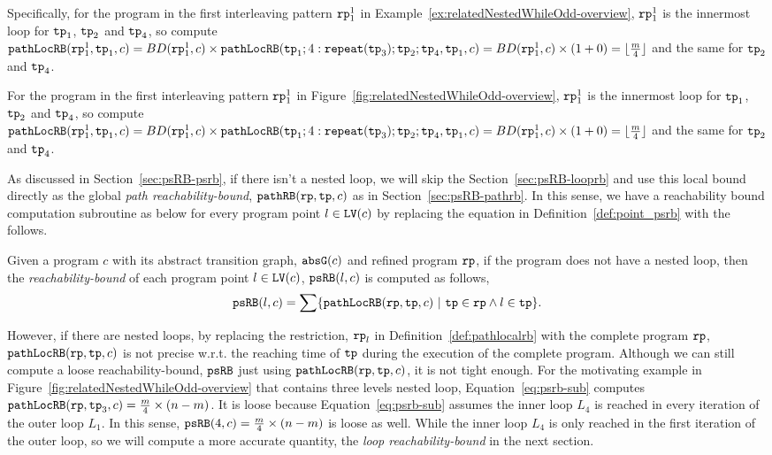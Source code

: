 Specifically, for the program in the first interleaving pattern $\mathtt{rp}_1^1$ in Example~\ref{ex:relatedNestedWhileOdd-overview}, $\mathtt{rp}_1^1$ is the innermost loop for $\mathtt{tp}_1$, $\mathtt{tp}_2$ and $\mathtt{tp}_4$, 
so compute $\mathtt{pathLocRB}(\mathtt{rp}_1^1, \mathtt{tp}_1, c) = BD(\mathtt{rp}_1^1, c) \times \mathtt{pathLocRB}(\mathtt{tp}_1; 4:\mathtt{repeat}(\mathtt{tp}_3); \mathtt{tp}_2; \mathtt{tp}_4, \mathtt{tp}_1, c)
= BD(\mathtt{rp}_1^1, c) \times (1 + 0) = \lfloor \frac{m}{4} \rfloor $ and the same for $\mathtt{tp}_2$ and $\mathtt{tp}_4$.


For the program in the first interleaving pattern $\mathtt{rp}_1^1$ in Figure~\ref{fig:relatedNestedWhileOdd-overview}, $\mathtt{rp}_1^1$ is the innermost loop for $\mathtt{tp}_1$, $\mathtt{tp}_2$ and $\mathtt{tp}_4$, 
 so compute $\mathtt{pathLocRB}(\mathtt{rp}_1^1, \mathtt{tp}_1, c) = BD(\mathtt{rp}_1^1, c) \times \mathtt{pathLocRB}(\mathtt{tp}_1; 4:\mathtt{repeat}(\mathtt{tp}_3); \mathtt{tp}_2; \mathtt{tp}_4, \mathtt{tp}_1, c)
 = BD(\mathtt{rp}_1^1, c) \times (1 + 0) = \lfloor \frac{m}{4} \rfloor $ and the same for $\mathtt{tp}_2$ and $\mathtt{tp}_4$.

 As discussed in Section~\ref{sec:psRB-psrb}, if there isn't a nested loop, we will skip the Section~\ref{sec:psRB-looprb} and use this local bound directly as the global \emph{path reachability-bound}, $\mathtt{pathRB}(\mathtt{rp}, \mathtt{tp}, c)$ as in Section~\ref{sec:psRB-pathrb}. 
 In this sense, we have a reachability bound computation subroutine as below for every program point $l \in \mathtt{LV}(c)$ by replacing the equation in Definition~\ref{def:point_psrb} with the follows.

 \begin{defn}
  \label{def:psrb-sub}
  Given a program $c$ with its {abstract transition graph}, $\mathtt{abs}{\mathtt{G}}(c)$ and refined program $\mathtt{rp}$,
  if the program does not have a nested loop, then
  the \emph{reachability-bound} of each program point $l \in \mathtt{LV}(c)$, $\mathtt{psRB}(l, c)$ is computed as follows,
  \begin{equation}
 \label{eq:psrb-sub}
 \psRB(l, c) = 
 \sum
 \left\{ \outinB(\rprog, \tpath, c) ~\vert~ \tpath \in \rprog \land 
 l \in \tpath \right\}.
 \end{equation}
\end{defn}

However, if there are nested loops, 
by replacing the restriction, $\mathtt{rp}_l$ in Definition~\ref{def:pathlocalrb} with the complete program $\mathtt{rp}$, $\mathtt{pathLocRB}(\mathtt{rp}, \mathtt{tp}, c)$ is not precise w.r.t. the reaching time of $\mathtt{tp}$ during the execution of
the complete program.
Although we can still compute a loose reachability-bound, $\mathtt{psRB}$ just using $\mathtt{pathLocRB}(\mathtt{rp}, \mathtt{tp}, c)$, it is not tight enough. 
For the motivating example in Figure~\ref{fig:relatedNestedWhileOdd-overview} that contains three levels nested loop, Equation~\ref{eq:psrb-sub} computes
$\mathtt{pathLocRB}(\mathtt{rp}, \mathtt{tp}_3, c) = \frac{m}{4} \times (n - m)$.
It is loose because Equation~\ref{eq:psrb-sub} assumes the inner loop $L_4$ is reached in every iteration of the outer loop $L_1$. In this sense, $\mathtt{psRB}(4, c) = \frac{m}{4} \times (n - m)$ is loose as well.
While the inner loop $L_4$ is only reached in the first iteration of the outer loop,
so we will compute a more accurate quantity, the \emph{loop reachability-bound} in the next section.